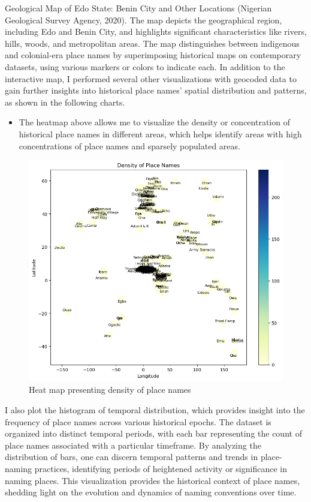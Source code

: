 Geological Map of Edo State: Benin City and Other Locations (Nigerian Geological Survey Agency, 2020). The map depicts the geographical region, including Edo and Benin City, and highlights significant characteristics like rivers, hills, woods, and metropolitan areas. The map distinguishes between indigenous and colonial-era place names by superimposing historical maps on contemporary datasets, using various markers or colors to indicate each.
\newpage
In addition to the interactive map, I performed several other visualizations with geocoded data to gain further insights into historical place names' spatial distribution and patterns, as shown in the following charts.
\begin{itemize}
    \item The heatmap above allows me to visualize the density or concentration of historical place names in different areas, which helps identify areas with high concentrations of place names and sparsely populated areas.
\end{itemize}

\begin{figure}[h!]
    \centering
    \includegraphics[width=1\linewidth]{heatmap1.png}
    \caption{Heat map presenting density of place names}
    \label{fig:heatmap}
\end{figure}
\newpage
I also plot the histogram of temporal distribution, which provides insight into the frequency of place names across various historical epochs. The dataset is organized into distinct temporal periods, with each bar representing the count of place names associated with a particular timeframe. By analyzing the distribution of bars, one can discern temporal patterns and trends in place-naming practices, identifying periods of heightened activity or significance in naming places. This visualization provides the historical context of place names, shedding light on the evolution and dynamics of naming conventions over time.

